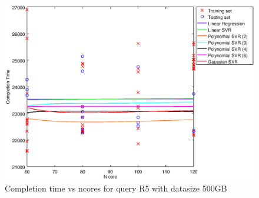 
\begin {figure}[hbtp]
\centering
\includegraphics[width=\textwidth]{output/R5_500_1_OVER_NCORES/plot_R5_500.eps}
\caption{Completion time vs ncores for query R5 with datasize 500GB}
\label{fig:all_nonlinear_R5_500}
\end {figure}
